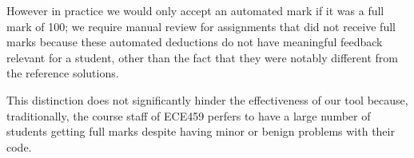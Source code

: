 However in practice we would only accept an automated mark if it was a full mark of 100; we require manual review for assignments that did not receive full marks because these automated deductions do not have meaningful feedback relevant for a student, other than the fact that they were notably different from the reference solutions. 

This distinction does not significantly hinder the effectiveness of our tool because, traditionally, the course staff of ECE459 perfers to have a large number of students getting full marks despite having minor or benign problems with their code.
